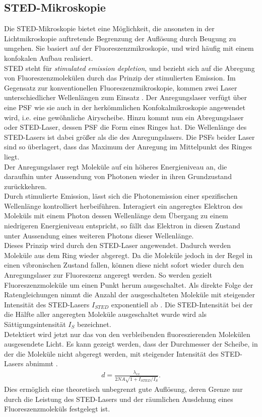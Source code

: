 \subsection{STED-Mikroskopie}
Die STED-Mikroskopie bietet eine Möglichkeit, die ansonsten in der Lichtmikroskopie auftretende Begrenzung der Auflösung durch Beugung zu umgehen.
Sie basiert auf der Fluoreszenzmikroskopie, und wird häufig mit einem konfokalen Aufbau realisiert.
\\
STED steht für \emph{stimulated emission depletion}, und bezieht sich auf die Abregung von Fluoreszenzmolekülen durch das Prinzip der stimulierten Emission. 
Im Gegensatz zur konventionellen Fluoreszenzmikroskopie, kommen zwei Laser unterschiedlicher Wellenlängen zum Einsatz \cite{hell}. 
Der Anregungslaser verfügt über eine PSF wie sie auch in der herkömmlichen Konfokalmikroskopie angewendet wird, i.e. eine gewöhnliche Airyscheibe.
Hinzu kommt nun ein Abregungslaser oder STED-Laser, dessen PSF die Form eines Ringes hat. Die Wellenlänge des STED-Lasers ist dabei größer als die des Anregungslasers.
Die PSFs beider Laser sind so überlagert, dass das Maximum der Anregung im Mittelpunkt des Ringes liegt.
\\
Der Anregungslaser regt Moleküle auf ein höheres Energieniveau an, die daraufhin unter Aussendung von Photonen wieder in ihren Grundzustand zurückkehren.
\\
Durch stimulierte Emission, lässt sich die Photonemission einer spezifischen Wellenlänge kontrolliert herbeiführen.
Interagiert ein angeregtes Elektron des Moleküls mit einem Photon dessen Wellenlänge dem Übergang zu einem niedrigeren Energieniveau entspricht, so fällt das Elektron in diesen Zustand unter Aussendung eines weiteren Photons dieser Wellenlänge.
\\
Dieses Prinzip wird durch den STED-Laser angewendet. Dadurch werden Moleküle aus dem Ring wieder abgeregt.
Da die Moleküle jedoch in der Regel in einen vibronischen Zustand fallen, können diese nicht sofort wieder durch den Anregungslaser zur Fluoreszenz angeregt werden.
So werden gezielt Fluoreszenzmoleküle um einen Punkt herum ausgeschaltet.
Als direkte Folge der Ratengleichungen nimmt die Anzahl der ausgeschalteten Moleküle mit steigender Intensität des STED-Lasers $I_{STED}$ exponentiell ab \cite{hell_exp}.
Die STED-Intensität bei der die Hälfte aller angeregten Moleküle ausgeschaltet wurde wird als Sättigungsintensität $I_S$ bezeichnet.
\\
Detektiert wird jetzt nur das von den verbleibenden fluoreszierenden Molekülen ausgesendete Licht. 
Es kann gezeigt werden, dass der Durchmesser der Scheibe, in der die Moleküle nicht abgeregt werden, mit steigender Intensität des STED-Lasers abnimmt \cite{hell}.
\begin{align}
	d = \frac{\lambda_{ex}}{2NA\sqrt{1+I_{STED}/I_S}}. \label{eq:sted_res}
\end{align}
Dies ermöglich eine theoretisch unbegrenzt gute Auflösung, deren Grenze nur durch die Leistung des STED-Lasers und der räumlichen Ausdehung eines Fluoreszenzmoleküls festgelegt ist.

